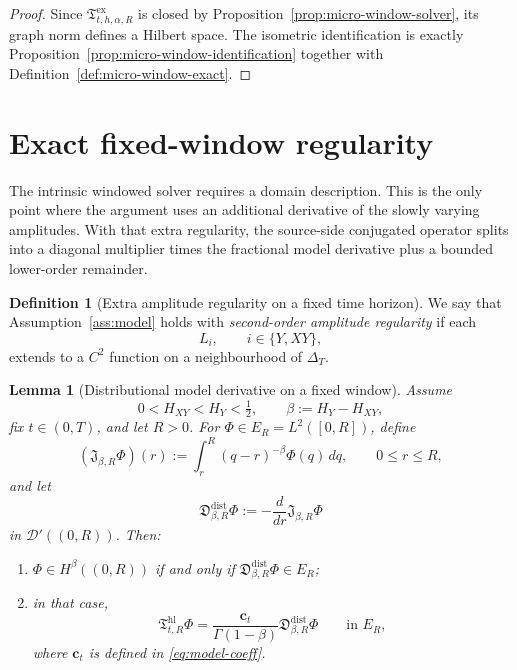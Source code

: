\documentclass[11pt,a4paper]{amsart}
\theoremstyle{plain}
\newtheorem{lemma}[theorem]{Lemma}
\theoremstyle{definition}
\newtheorem{definition}[theorem]{Definition}
\theoremstyle{remark}
\begin{document}
\begin{proof}
Since \(\mathfrak T_{t,h,\alpha,R}^{\mathrm{ex}}\) is closed by
Proposition~\ref{prop:micro-window-solver}, its graph norm defines a Hilbert space. The isometric
identification is exactly Proposition~\ref{prop:micro-window-identification} together with
Definition~\ref{def:micro-window-exact}.
\end{proof}

\section{Exact fixed-window regularity}\label{sec:micro-regularity}

The intrinsic windowed solver requires a domain description.  This is the only point where the
argument uses an additional derivative of the slowly varying amplitudes.  With that extra
regularity, the source-side conjugated operator splits into a diagonal multiplier times the
fractional model derivative plus a bounded lower-order remainder.

\begin{definition}[Extra amplitude regularity on a fixed time horizon]
\label{def:model-c2}
We say that Assumption~\ref{ass:model} holds with \emph{second-order amplitude regularity} if each
\[
L_i,\qquad i\in\{Y,XY\},
\]
extends to a \(C^2\) function on a neighbourhood of \(\Delta_T\).
\end{definition}

\begin{lemma}[Distributional model derivative on a fixed window]
\label{lem:window-distribution}
Assume
\[
0<H_{XY}<H_Y<\tfrac12,
\qquad
\beta:=H_Y-H_{XY},
\]
fix \(t\in(0,T)\), and let \(R>0\). For \(\Phi\in E_R=L^2([0,R])\), define
\[
(\mathfrak J_{\beta,R}\Phi)(r):=\int_r^R (q-r)^{-\beta}\Phi(q)\,dq,
\qquad 0\le r\le R,
\]
and let
\[
\mathfrak D_{\beta,R}^{\mathrm{dist}}\Phi
:=
-\frac{d}{dr}\mathfrak J_{\beta,R}\Phi
\]
in \(\mathcal D'((0,R))\). Then:
\begin{enumerate}[label=(\roman*)]
\item \(\Phi\in H^\beta((0,R))\) if and only if
\(\mathfrak D_{\beta,R}^{\mathrm{dist}}\Phi\in E_R\);
\item in that case,
\begin{equation}\label{eq:window-distribution}
\mathfrak T_{t,R}^{\mathrm{hl}}\Phi
=
\frac{\mathbf c_t}{\Gamma(1-\beta)}
\mathfrak D_{\beta,R}^{\mathrm{dist}}\Phi
\qquad\text{in }E_R,
\end{equation}
where \(\mathbf c_t\) is defined in \eqref{eq:model-coeff}.
\end{enumerate}
\end{lemma}
\end{document}
